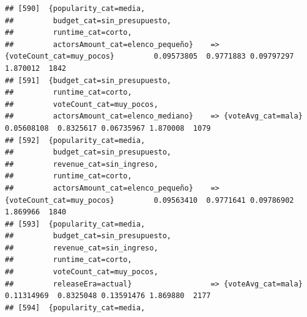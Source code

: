 \documentclass[
]{article}
\begin{document}
\begin{verbatim}
## [590]  {popularity_cat=media,                                                                                                   
##         budget_cat=sin_presupuesto,                                                                                             
##         runtime_cat=corto,                                                                                                      
##         actorsAmount_cat=elenco_pequeño}    => {voteCount_cat=muy_pocos}         0.09573805  0.9771883 0.09797297 1.870012  1842
## [591]  {budget_cat=sin_presupuesto,                                                                                             
##         runtime_cat=corto,                                                                                                      
##         voteCount_cat=muy_pocos,                                                                                                
##         actorsAmount_cat=elenco_mediano}    => {voteAvg_cat=mala}                0.05608108  0.8325617 0.06735967 1.870008  1079
## [592]  {popularity_cat=media,                                                                                                   
##         budget_cat=sin_presupuesto,                                                                                             
##         revenue_cat=sin_ingreso,                                                                                                
##         runtime_cat=corto,                                                                                                      
##         actorsAmount_cat=elenco_pequeño}    => {voteCount_cat=muy_pocos}         0.09563410  0.9771641 0.09786902 1.869966  1840
## [593]  {popularity_cat=media,                                                                                                   
##         budget_cat=sin_presupuesto,                                                                                             
##         revenue_cat=sin_ingreso,                                                                                                
##         runtime_cat=corto,                                                                                                      
##         voteCount_cat=muy_pocos,                                                                                                
##         releaseEra=actual}                  => {voteAvg_cat=mala}                0.11314969  0.8325048 0.13591476 1.869880  2177
## [594]  {popularity_cat=media,                                                                                                   

\end{verbatim}
\end{document}
